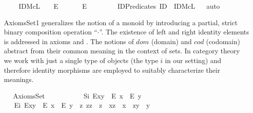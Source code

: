 \begin{isabellebody}
\ %
\isanewline
\ \isamarkupfalse%
\ {\isachardoublequoteopen}IDMcL\ {\isasymrho}\ {\isasymequiv}\ {\isacharparenleft}\isactrlbold {\isasymforall}{\isasymalpha}{\isachardot}\ E{\isacharparenleft}{\isasymrho}{\isasymcdot}{\isasymalpha}{\isacharparenright}\ \isactrlbold {\isasymrightarrow}\ {\isasymrho}{\isasymcdot}{\isasymalpha}\ {\isacharequal}\ {\isasymalpha}{\isacharparenright}\ \isactrlbold {\isasymand}\ {\isacharparenleft}\isactrlbold {\isasymforall}{\isasymbeta}{\isachardot}\ E{\isacharparenleft}{\isasymbeta}{\isasymcdot}{\isasymrho}{\isacharparenright}\ \isactrlbold {\isasymrightarrow}\ {\isasymbeta}{\isasymcdot}{\isasymrho}\ {\isacharequal}\ {\isasymbeta}{\isacharparenright}{\isachardoublequoteclose}\isanewline
\isanewline
\ %
\isanewline
\ \isamarkupfalse%
\ IDPredicates{\isacharcolon}\ {\isachardoublequoteopen}ID\ {\isasymequiv}\ IDMcL{\isachardoublequoteclose}%
\isadelimproof
\ %
\endisadelimproof
%
\isatagproof
{}\isamarkupfalse%
\ auto%
\endisatagproof
{\isafoldproof}%
%
\isadelimproof
%
\endisadelimproof
%
\isamarkuptrue%
%
\isamarkuptrue%
%
\begin{isamarkuptext}%
AxiomsSet1 generalizes the notion of a monoid by introducing a partial, strict binary 
      composition operation ``$\cdot$''. The existence of left and right identity elements is 
      addressed in axioms  and . The notions of $dom$ (domain) and
      $cod$ (codomain)
      abstract from their common meaning in the context of sets. In category theory we
     work with just a single type of objects (the type $i$ in our setting) and therefore 
     identity morphisms are employed to suitably characterize their
     meanings.%
\end{isamarkuptext}\isamarkuptrue%
\ \isamarkupfalse%
\ AxiomsSet{}\ {\isacharequal}\isanewline
\ \ \ \ \ \ \isanewline
\ \ \ S\isactrlsub i{\isacharcolon}\ {\isachardoublequoteopen}E{\isacharparenleft}x{\isasymcdot}y{\isacharparenright}\ \isactrlbold {\isasymrightarrow}\ {\isacharparenleft}E\ x\ \isactrlbold {\isasymand}\ E\ y{\isacharparenright}{\isachardoublequoteclose}\ \isanewline
\ \ \ E\isactrlsub i{\isacharcolon}\ {\isachardoublequoteopen}E{\isacharparenleft}x{\isasymcdot}y{\isacharparenright}\ \isactrlbold {\isasymleftarrow}\ {\isacharparenleft}E\ x\ \isactrlbold {\isasymand}\ E\ y\ \isactrlbold {\isasymand}\ {\isacharparenleft}\isactrlbold {\isasymexists}z{\isachardot}\ z{\isasymcdot}z\ {\isasymcong}\ z\ \isactrlbold {\isasymand}\ x{\isasymcdot}z\ {\isasymcong}\ x\ \isactrlbold {\isasymand}\ z{\isasymcdot}y\ {\isasymcong}\ y{\isacharparenright}{\isacharparenright}{\isachardoublequoteclose}\ \isanewline

\end{isabellebody}

